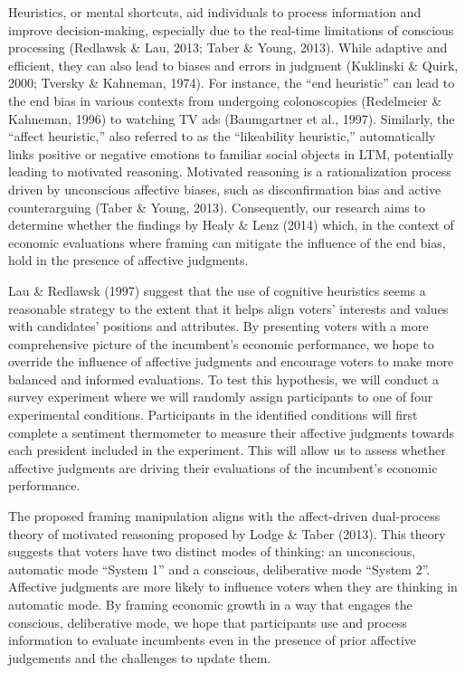 \documentclass[
]{article}
\begin{document}
Heuristics, or mental shortcuts, aid individuals to process information
and improve decision-making, especially due to the real-time limitations
of conscious processing (Redlawsk \& Lau, 2013; Taber \& Young, 2013).
While adaptive and efficient, they can also lead to biases and errors in
judgment (Kuklinski \& Quirk, 2000; Tversky \& Kahneman, 1974). For
instance, the ``end heuristic'' can lead to the end bias in various
contexts from undergoing colonoscopies (Redelmeier \& Kahneman, 1996) to
watching TV ads (Baumgartner et al., 1997). Similarly, the ``affect
heuristic,'' also referred to as the ``likeability heuristic,''
automatically links positive or negative emotions to familiar social
objects in LTM, potentially leading to motivated reasoning. Motivated
reasoning is a rationalization process driven by unconscious affective
biases, such as disconfirmation bias and active counterarguing (Taber \&
Young, 2013). Consequently, our research aims to determine whether the
findings by Healy \& Lenz (2014) which, in the context of economic
evaluations where framing can mitigate the influence of the end bias,
hold in the presence of affective judgments.

Lau \& Redlawsk (1997) suggest that the use of cognitive heuristics
seems a reasonable strategy to the extent that it helps align voters'
interests and values with candidates' positions and attributes. By
presenting voters with a more comprehensive picture of the incumbent's
economic performance, we hope to override the influence of affective
judgments and encourage voters to make more balanced and informed
evaluations. To test this hypothesis, we will conduct a survey
experiment where we will randomly assign participants to one of four
experimental conditions. Participants in the identified conditions will
first complete a sentiment thermometer to measure their affective
judgments towards each president included in the experiment. This will
allow us to assess whether affective judgments are driving their
evaluations of the incumbent's economic performance.

The proposed framing manipulation aligns with the affect-driven
dual-process theory of motivated reasoning proposed by Lodge \& Taber
(2013). This theory suggests that voters have two distinct modes of
thinking: an unconscious, automatic mode ``System 1'' and a conscious,
deliberative mode ``System 2''. Affective judgments are more likely to
influence voters when they are thinking in automatic mode. By framing
economic growth in a way that engages the conscious, deliberative mode,
we hope that participants use and process information to evaluate
incumbents even in the presence of prior affective judgements and the
challenges to update them.
\end{document}
